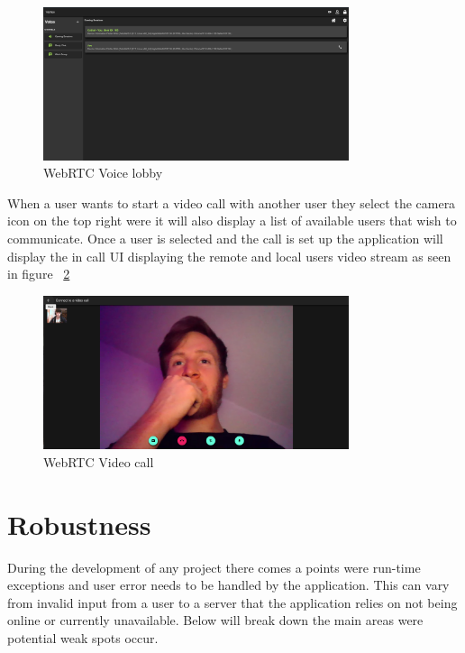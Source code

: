 \begin{figure}[h!]
    \caption{WebRTC Voice lobby}
    \label{image:voiceLobbyView}
    \centering
    \includegraphics[width=0.8\textwidth]{images/screenshotsOfPages/voiceCallLobby.png}
\end{figure}

When a user wants to start a video call with another user they select the camera icon on the top right were it will also display a list of available users that wish to communicate. Once a user is selected and the call is set up the application will display the in call UI displaying the remote and local users video stream as seen in figure ~\ref{image:videoCall}

\begin{figure}[h!]
    \caption{WebRTC Video call}
    \label{image:videoCall}
    \centering
    \includegraphics[width=0.8\textwidth]{images/screenshotsOfPages/webRTCProof2.png}
\end{figure}

\section{Robustness}
During the development of any project there comes a points were run-time exceptions and user error needs to be handled by the application. This can vary from invalid input from a user to a server that the application relies on not being online or currently unavailable. Below will break down the main areas were potential weak spots occur.

